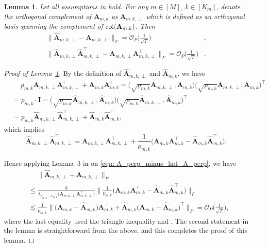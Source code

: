 \documentclass[aos]{imsart}
\theoremstyle{plain}
\newtheorem{lemma}[theorem]{Lemma}
\theoremstyle{definition}
\def\wh#1{\widehat{#1}}
\def\cO{\mathcal{O}}
\def\bI{\mathbf{I}}
\def\bA{\mathbf{A}}
\def\trans{\intercal}
\begin{document}
\begin{lemma}\label{lemma: A_perp_rate}
Let all assumptions in  hold. For any $m\in[M]$, $k\in[K_m]$, denote the orthogonal complement of $\bA_{m,k}$ as $\bA_{m,k,\perp}$ which is defined as an orthogonal basis spanning the complement of $\textnormal{col}(\bA_{m,k})$. Then
\begin{align*}
    \Big\| \wh{\bA}_{m,k,\perp} -\bA_{m,k,\perp} \Big\|_F = \cO_P\Big( \frac{1}{\sqrt{T}} \Big) &, \\
    \Big\| \wh{\bA}_{m,k,\perp} \wh{\bA}_{m,k,\perp}^\trans - \bA_{m,k,\perp} \bA_{m,k,\perp}^\trans \Big\|_F = \cO_P\Big( \frac{1}{\sqrt{T}} \Big) &.
\end{align*}
\end{lemma}

\begin{proof}[Proof of Lemma~\ref{lemma: A_perp_rate}]
By the definition of $\wh{\bA}_{m,k,\perp}$ and $\wh{\bA}_{m,k}$, we have
\begin{align*}
    &\;\quad
    p_{m,k} \bA_{m,k,\perp} \bA_{m,k,\perp}^\trans + \bA_{m,k} \bA_{m,k}^\trans = \Big( \sqrt{p_{m,k}} \bA_{m,k,\perp}, \bA_{m,k} \Big) \Big( \sqrt{p_{m,k}} \bA_{m,k,\perp}, \bA_{m,k} \Big)^\trans \\
    &=
    p_{m,k} \cdot \bI = \Big( \sqrt{p_{m,k}} \wh{\bA}_{m,k,\perp}, \wh{\bA}_{m,k} \Big) \Big( \sqrt{p_{m,k}} \wh{\bA}_{m,k,\perp}, \wh{\bA}_{m,k} \Big)^\trans \\
    &=
    p_{m,k} \wh{\bA}_{m,k,\perp} \wh{\bA}_{m,k,\perp}^\trans + \wh{\bA}_{m,k} \wh{\bA}_{m,k}^\trans ,
\end{align*}
which implies
\begin{equation}
\label{eqn: A_perp_minus_hat_A_perp}
\wh{\bA}_{m,k,\perp} \wh{\bA}_{m,k,\perp}^\trans = \bA_{m,k,\perp} \bA_{m,k,\perp}^\trans + \frac{1}{p_{m,k}} \big( \bA_{m,k} \bA_{m,k}^\trans - \wh{\bA}_{m,k} \wh{\bA}_{m,k}^\trans \big) .
\end{equation}

Hence applying Lemma~3 in \cite{Lametal2011} on \eqref{eqn: A_perp_minus_hat_A_perp}, we have
\begin{align*}
    &\;\quad
    \Big\| \wh{\bA}_{m,k,\perp} -\bA_{m,k,\perp} \Big\|_F \\
    &\leq
    \frac{8}{\lambda_{p_{m,k} -r_{m,k}}\big( \bA_{m,k,\perp} \bA_{m,k,\perp}^\trans \big)} \Big\| \frac{1}{p_{m,k}} \big( \bA_{m,k} \bA_{m,k}^\trans - \wh{\bA}_{m,k} \wh{\bA}_{m,k}^\trans \big) \Big\|_F \\
    &\lesssim
    \frac{1}{p_{m,k}} \Big\| \big( \bA_{m,k} - \wh{\bA}_{m,k} \big) \bA_{m,k}^\trans + \wh{\bA}_{m,k} \big( \bA_{m,k} - \wh{\bA}_{m,k} \big)^\trans \Big\|_F
    = \cO_P\Big( \frac{1}{\sqrt{T}} \Big) ,
\end{align*}
where the last equality used the triangle inequality and . The second statement in the lemma is straightforward from the above, and this completes the proof of this lemma.
\end{proof}
\end{document}
